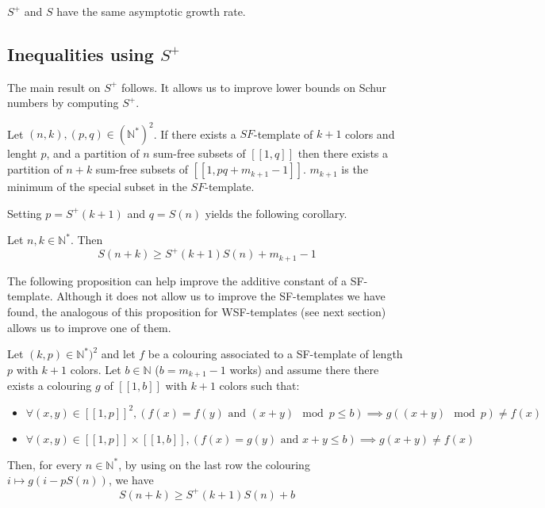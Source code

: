 \begin{remark}
	\(S^+\) and \(S\) have the same asymptotic growth rate.
\end{remark}


\subsection{Inequalities using \(S^+\)}

The main result on \(S^+\) follows. It allows us to improve lower bounds on Schur numbers by computing \(S^+\).

\begin{theorem}
	Let \((n,k), (p,q) \in (\mathbb{N}^*)^2\). If there exists a \(SF\)-template of \(k+1\) colors and lenght \(p\),
	and a partition of \(n\) sum-free subsets of \([\![1,q]\!]\) then there exists a partition of \(n+k\) sum-free subsets
	of \([\![1,pq+m_{k+1}-1]\!]\). \(m_{k+1}\) is the minimum of the special subset in the \(SF\)-template.
\end{theorem}

Setting \(p = S^+(k+1)\) and \(q = S(n)\) yields the following corollary.

\begin{corollary}
	Let \(n, k \in \mathbb{N}^*\). Then
	\[ S(n+k) \geqslant S^+(k+1)S(n) + m_{k+1} - 1 \]
\end{corollary}

\begin{remark}
The following proposition can help improve the additive constant of a SF-template. Although it does not allow us to improve the SF-templates 
we have found, the analogous of this proposition for WSF-templates (see next section) allows us to improve one of them.
\end{remark}

\begin{proposition}
Let \((k, p) \in \mathbb{N}^*)^2\) and let \(f\) be a colouring associated to a SF-template of length \(p\) with \(k+1\) colors. Let 
\(b \in \mathbb{N}\) (\(b = m_{k+1} - 1\) works) and assume there there exists a colouring \(g\) of \([\![1, b]\!]\) with \(k+1\) colors such that:
\begin{itemize}
	\item \(\forall (x, y) \in [\![1, p]\!]^2,(f(x) = f(y) \text{ and } (x + y) \mod p \leqslant b) 
	\implies g((x + y) \mod p) \neq f(x)\)
	\item \(\forall (x, y) \in [\![1, p]\!] \times  [\![1, b]\!], (f(x) = g(y) \text{ and } x + y \leqslant b) 
	\implies g(x + y) \neq f(x)\)
\end{itemize}
Then, for every \(n \in \mathbb{N}^*\), by using on the last row the colouring \(i \longmapsto g(i - p S(n))\), we have\\
\[ S(n+k) \geqslant S^+(k+1)S(n) + b\]
\end{proposition}

